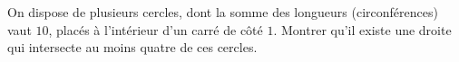 On dispose de plusieurs cercles, dont la somme des longueurs
(circonférences) vaut $10$, placés à l'intérieur d'un carré de côté $1$. Montrer qu'il existe une droite qui
intersecte au moins quatre de ces cercles.
